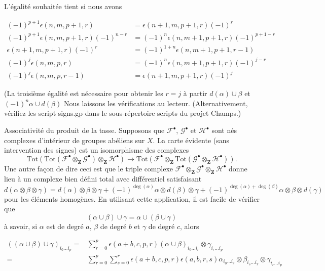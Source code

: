 L'égalité souhaitée tient si nous avons

\begin{align*}
(-1)^{p + 1} \epsilon(n, m, p + 1, r)
& =
\epsilon(n + 1, m, p + 1, r) (-1)^r \\
(-1)^{p + 1} \epsilon(n, m, p + 1, r) (-1)^{n - r}
& =
(-1)^n \epsilon(n, m + 1, p + 1, r) (-1)^{p + 1 - r} \\
\epsilon(n + 1, m, p + 1, r) (-1)^r
& =
(-1)^{1 + n} \epsilon(n, m + 1, p + 1, r - 1) \\
(-1)^j \epsilon(n, m, p, r)
& =
(-1)^n \epsilon(n, m + 1, p + 1, r) (-1)^{j - r} \\
(-1)^j \epsilon(n, m, p, r - 1)
& =
\epsilon(n + 1, m, p + 1, r) (-1)^j
\end{align*}

(La troisième égalité est nécessaire pour obtenir les $r = j$
à partir $d(\alpha) \cup \beta$ et $(-1)^n \alpha \cup d(\beta)$
Nous laissons les vérifications au lecteur. (Alternativement, vérifiez les script signs.gp dans le sous-répertoire scripts du projet Champs.)

\medskip\noindent

Associativité du produit de la tasse. Supposons que ${\mathcal F}^\bullet$,
${\mathcal G}^\bullet$ et ${\mathcal H}^\bullet$ sont nés complexes d'intérieur de groupes abéliens sur $X$. La carte évidente (sans intervention des signes) est un isomorphisme des complexes
$$
\text{Tot}(
\text{Tot}({\mathcal F}^\bullet \otimes_{\mathbf Z} {\mathcal G}^\bullet)
\otimes_{\mathbf Z} {\mathcal H}^\bullet
)
\longrightarrow
\text{Tot}(
{\mathcal F}^\bullet \otimes_{\mathbf Z}
\text{Tot}({\mathcal G}^\bullet \otimes_{\mathbf Z} {\mathcal H}^\bullet)
).
$$
Une autre façon de dire ceci est que le triple complexe
${\mathcal F}^\bullet \otimes_{\mathbf Z} {\mathcal G}^\bullet
\otimes_{\mathbf Z} {\mathcal H}^\bullet$ donne lieu à un complexe bien défini total avec différentiel satisfaisant
$$
d(\alpha \otimes \beta \otimes \gamma) =
d(\alpha) \otimes \beta \otimes \gamma +
(-1)^{\deg(\alpha)} \alpha \otimes d(\beta) \otimes \gamma +
(-1)^{\deg(\alpha) + \deg(\beta)} \alpha \otimes \beta \otimes d(\gamma)
$$
pour les éléments homogènes. En utilisant cette application, il est facile de vérifier que
$$
(\alpha \cup \beta) \cup \gamma = \alpha \cup ( \beta \cup \gamma)
$$
à savoir, si $\alpha$ est de degré $a$, $\beta$ de degré $b$ et
$\gamma$ de degré $c$, alors

\begin{align*}
((\alpha \cup \beta) \cup \gamma)_{i_0 \ldots i_p}
= &
\sum\nolimits_{r = 0}^p
\epsilon(a + b, c, p, r)
(\alpha \cup \beta)_{i_0 \ldots i_r} \otimes \gamma_{i_r \ldots i_p}
\\
= &
\sum\nolimits_{r = 0}^p
\sum\nolimits_{s = 0}^r
\epsilon(a + b, c, p, r) \epsilon(a, b, r, s)
\alpha_{i_0 \ldots i_s} \otimes
\beta_{i_s \ldots i_r} \otimes
\gamma_{i_r \ldots i_p}
\end{align*}

